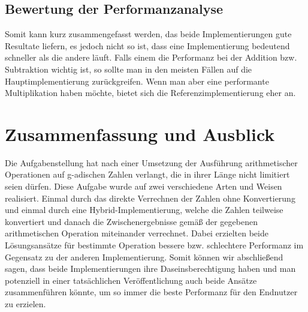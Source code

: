 \documentclass[course=erap]{aspdoc}
\begin{document}
    \subsection{Bewertung der Performanzanalyse}

    Somit kann kurz zusammengefasst werden, das beide Implementierungen gute Resultate liefern, es jedoch nicht so ist,
    dass eine Implementierung bedeutend schneller als die andere läuft. Falls einem die Performanz bei der Addition bzw. Subtraktion wichtig ist,
    so sollte man in den meisten Fällen auf die Hauptimplementierung zurückgreifen. Wenn man aber eine performante Multiplikation haben möchte, bietet sich
    die Referenzimplementierung eher an. \\


    \section{Zusammenfassung und Ausblick}

    Die Aufgabenstellung hat nach einer Umsetzung der Ausführung arithmetischer Operationen auf
    g-adischen Zahlen verlangt, die in ihrer Länge nicht limitiert seien dürfen. Diese Aufgabe wurde auf zwei
    verschiedene Arten und Weisen realisiert. Einmal durch das direkte Verrechnen der Zahlen ohne Konvertierung und
    einmal durch eine Hybrid-Implementierung, welche die Zahlen teilweise konvertiert und danach die Zwischenergebnisse gemäß der
    gegebenen arithmetischen Operation miteinander verrechnet. Dabei erzielten beide Lösungsansätze für bestimmte Operation bessere bzw. schlechtere
    Performanz im Gegensatz zu der anderen Implementierung. Somit können wir abschließend sagen, dass beide Implementierungen ihre Daseinsberechtigung haben
    und man potenziell in einer tatsächlichen Veröffentlichung auch beide Ansätze zusammenführen könnte, um so immer die beste Performanz für den Endnutzer
    zu erzielen.

    
    {}
\end{document}

